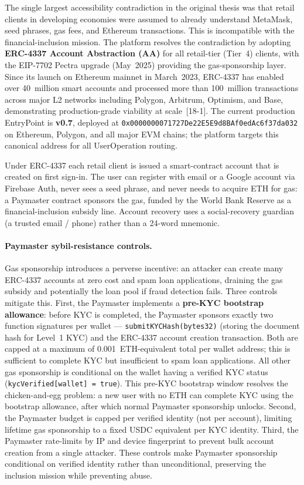 \documentclass[12pt,a4paper]{report}
\begin{document}
The single largest accessibility contradiction in the original thesis was that retail clients in developing economies were assumed to already understand MetaMask, seed phrases, gas fees, and Ethereum transactions. This is incompatible with the financial-inclusion mission. The platform resolves the contradiction by adopting \textbf{ERC-4337 Account Abstraction (AA)} for all retail-tier (Tier~4) clients, with the EIP-7702 Pectra upgrade (May~2025) providing the gas-sponsorship layer. Since its launch on Ethereum mainnet in March~2023, ERC-4337 has enabled over 40~million smart accounts and processed more than 100~million transactions across major L2 networks including Polygon, Arbitrum, Optimism, and Base, demonstrating production-grade viability at scale~[18-1]. The current production EntryPoint is \textbf{v0.7}, deployed at \texttt{0x0000000071727De22E5E9d8BAf0edAc6f37da032} on Ethereum, Polygon, and all major EVM chains; the platform targets this canonical address for all UserOperation routing.

Under ERC-4337 each retail client is issued a smart-contract account that is created on first sign-in. The user can register with email or a Google account via Firebase Auth, never sees a seed phrase, and never needs to acquire ETH for gas: a Paymaster contract sponsors the gas, funded by the World Bank Reserve as a financial-inclusion subsidy line. Account recovery uses a social-recovery guardian (a trusted email / phone) rather than a 24-word mnemonic.

\paragraph{Paymaster sybil-resistance controls.}
Gas sponsorship introduces a perverse incentive: an attacker can create many ERC-4337 accounts at zero cost and spam loan applications, draining the gas subsidy and potentially the loan pool if fraud detection fails. Three controls mitigate this. First, the Paymaster implements a \textbf{pre-KYC bootstrap allowance}: before KYC is completed, the Paymaster sponsors exactly two function signatures per wallet --- \texttt{submitKYCHash(bytes32)} (storing the document hash for Level~1 KYC) and the ERC-4337 account creation transaction. Both are capped at a maximum of 0.001~ETH-equivalent total per wallet address; this is sufficient to complete KYC but insufficient to spam loan applications. All other gas sponsorship is conditional on the wallet having a verified KYC status (\texttt{kycVerified[wallet] = true}). This pre-KYC bootstrap window resolves the chicken-and-egg problem: a new user with no ETH can complete KYC using the bootstrap allowance, after which normal Paymaster sponsorship unlocks. Second, the Paymaster budget is capped per verified identity (not per account), limiting lifetime gas sponsorship to a fixed USDC equivalent per KYC identity. Third, the Paymaster rate-limits by IP and device fingerprint to prevent bulk account creation from a single attacker. These controls make Paymaster sponsorship conditional on verified identity rather than unconditional, preserving the inclusion mission while preventing abuse.
\end{document}
